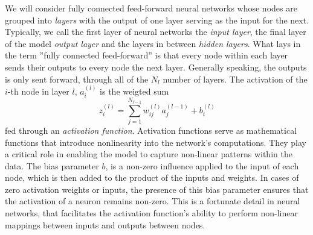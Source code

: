 \documentclass[a4paper, UKenglish, 11pt]{uiomaster}
\begin{document}
We will consider fully connected feed-forward neural networks whose nodes are grouped into \emph{layers} with the output of one layer serving as the input for the next. Typically, we call the first layer of neural networks the \emph{input layer}, the final layer of the model \emph{output layer} and the layers in between \emph{hidden layers}. What lays in the term ''fully connected feed-forward'' is that every node within each layer sends their outputs to every node the next layer. Generally speaking, the outputs is only sent forward, through all of the $N_l$ number of layers.  The activation of the $i$-th node in layer $l$, $a_i^{(l)}$ is the weigted sum
\begin{equation}
  z_i^{(l)} = \sum_{j=1}^{N_{l-1}} w_{ij}^{(l)} a_{j}^{(l-1)} + b_i^{(l)}
  \label{activation_node}
\end{equation}
fed through an \emph{activation function}. Activation functions serve as mathematical functions that introduce nonlinearity into the network's computations. They play a critical role in enabling the model to capture non-linear patterns within the data. The bias parameter $b$, is a non-zero influence applied to the input of each node, which is then added to the product of the inputs and weights. In cases of zero activation weights or inputs, the presence of this bias parameter ensures that the activation of a neuron remains non-zero. This is a fortunate detail in neural networks, that facilitates the activation function's ability to perform non-linear mappings between inputs and outputs between nodes.



\end{document}
